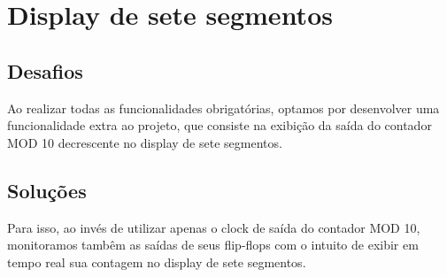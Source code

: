 \section{Display de sete segmentos}

\subsection{Desafios}

Ao realizar todas as funcionalidades obrigatórias, optamos por desenvolver uma funcionalidade extra ao projeto, que consiste na exibição da saída do contador MOD 10 decrescente no display de sete segmentos.

\subsection{Soluções}

Para isso, ao invés de utilizar apenas o clock de saída do contador MOD 10, monitoramos tambêm as saídas de seus flip-flops com o intuito de exibir em tempo real sua contagem no display de sete segmentos.